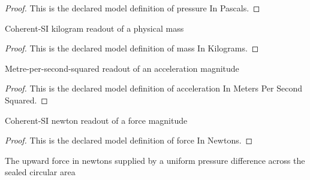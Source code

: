 \begin{proof}
  This is the declared model definition of pressure In Pascals.
\end{proof}
\begin{definition}
  \label{def:physics:phyx-mini-0720:phyxminiproblems-problemphyxmini0720-massinkilograms}
  Coherent-SI kilogram readout of a physical mass
\end{definition}
\begin{proof}
  This is the declared model definition of mass In Kilograms.
\end{proof}
\begin{definition}
  \label{def:physics:phyx-mini-0720:phyxminiproblems-problemphyxmini0720-accelerationinmeterspersecondsquared}
  Metre-per-second-squared readout of an acceleration magnitude
\end{definition}
\begin{proof}
  This is the declared model definition of acceleration In Meters Per Second Squared.
\end{proof}
\begin{definition}
  \label{def:physics:phyx-mini-0720:phyxminiproblems-problemphyxmini0720-forceinnewtons}
  Coherent-SI newton readout of a force magnitude
\end{definition}
\begin{proof}
  This is the declared model definition of force In Newtons.
\end{proof}
\begin{definition}
  \label{def:physics:phyx-mini-0720:phyxminiproblems-problemphyxmini0720-pressuredifferenceforceinnewtons}
  The upward force in newtons supplied by a uniform pressure difference across the sealed circular area
\end{definition}
